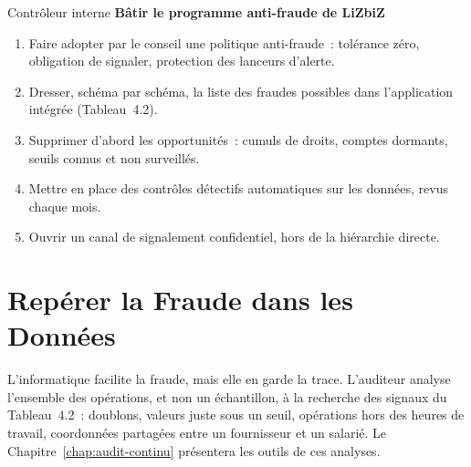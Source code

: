\begin{boxmetier}{Contrôleur interne}
\textbf{Bâtir le programme anti-fraude de LiZbiZ}
\begin{enumerate}
    \item Faire adopter par le conseil une politique anti-fraude~: tolérance
          zéro, obligation de signaler, protection des lanceurs d'alerte.
    \item Dresser, schéma par schéma, la liste des fraudes possibles dans
          l'application intégrée (Tableau~4.2).
    \item Supprimer d'abord les opportunités~: cumuls de droits, comptes
          dormants, seuils connus et non surveillés.
    \item Mettre en place des contrôles détectifs automatiques sur les
          données, revus chaque mois.
    \item Ouvrir un canal de signalement confidentiel, hors de la
          hiérarchie directe.
\end{enumerate}
\end{boxmetier}

\section{Repérer la Fraude dans les Données}
\label{sec:c04-donnees}

L'informatique facilite la fraude, mais elle en garde la trace. L'auditeur
analyse l'ensemble des opérations, et non un échantillon, à la recherche des
signaux du Tableau~4.2~: doublons, valeurs juste sous un seuil, opérations
hors des heures de travail, coordonnées partagées entre un fournisseur et un
salarié. Le Chapitre~\ref{chap:audit-continu} présentera les outils de ces
analyses.

